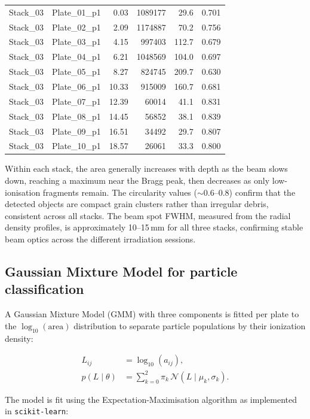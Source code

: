 \documentclass[12pt,a4paper]{article}
\begin{document}
\begin{longtable}{llrrrr}
Stack\_03 & Plate\_01\_p1 & 0.03 & 1089177 & 29.6 & 0.701 \\
Stack\_03 & Plate\_02\_p1 & 2.09 & 1174887 & 70.2 & 0.756 \\
Stack\_03 & Plate\_03\_p1 & 4.15 & 997403 & 112.7 & 0.679 \\
Stack\_03 & Plate\_04\_p1 & 6.21 & 1048569 & 104.0 & 0.697 \\
Stack\_03 & Plate\_05\_p1 & 8.27 & 824745 & 209.7 & 0.630 \\
Stack\_03 & Plate\_06\_p1 & 10.33 & 915009 & 160.7 & 0.681 \\
Stack\_03 & Plate\_07\_p1 & 12.39 & 60014 & 41.1 & 0.831 \\
Stack\_03 & Plate\_08\_p1 & 14.45 & 56852 & 38.1 & 0.839 \\
Stack\_03 & Plate\_09\_p1 & 16.51 & 34492 & 29.7 & 0.807 \\
Stack\_03 & Plate\_10\_p1 & 18.57 & 26061 & 33.3 & 0.800 \\
\end{longtable}

Within each
stack, the area generally increases with depth as the beam slows down,
reaching a maximum near the Bragg peak, then decreases as only
low-ionisation fragments remain. The circularity values ($\sim$0.6--0.8) confirm that
the detected objects are compact grain clusters rather than irregular
debris, consistent across all stacks. The beam spot FWHM, measured
from the radial density profiles, is approximately 10--15\,mm for all
three stacks, confirming stable beam optics across the different
irradiation sessions.

\subsection{Gaussian Mixture Model for particle classification}
\label{sec:gmm}

A Gaussian Mixture Model (GMM) with three components is fitted per
plate to the $\log_{10}(\text{area})$ distribution to separate
particle populations by their ionization density:

\begin{align}
L_{ij} &= \log_{10}(a_{ij}), \label{eq:logarea}\\
p(L\mid\theta) &= \sum_{k=0}^{2} \pi_k \,
\mathcal{N}(L\mid\mu_k,\sigma_k). \label{eq:gmm}
\end{align}

The model is fit using the Expectation-Maximisation algorithm as
implemented in \texttt{scikit-learn}:
\end{document}
